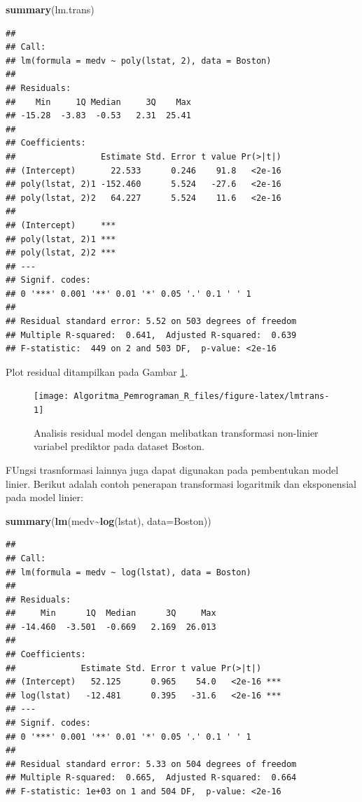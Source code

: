 \documentclass[
]{book}
\newenvironment{Shaded}{\begin{snugshade}}{\end{snugshade}}
\newcommand{\AttributeTok}[1]{\textcolor[rgb]{0.13,0.29,0.53}{#1}}
\newcommand{\FunctionTok}[1]{\textcolor[rgb]{0.13,0.29,0.53}{\textbf{#1}}}
\newcommand{\NormalTok}[1]{#1}
\newcommand{\SpecialCharTok}[1]{\textcolor[rgb]{0.81,0.36,0.00}{\textbf{#1}}}
\theoremstyle{definition}
\theoremstyle{definition}
\theoremstyle{definition}
\theoremstyle{definition}
\theoremstyle{remark}
\begin{document}
\begin{Shaded}
\begin{Highlighting}[]
\FunctionTok{summary}\NormalTok{(lm.trans)}
\end{Highlighting}
\end{Shaded}

\begin{verbatim}
## 
## Call:
## lm(formula = medv ~ poly(lstat, 2), data = Boston)
## 
## Residuals:
##    Min     1Q Median     3Q    Max 
## -15.28  -3.83  -0.53   2.31  25.41 
## 
## Coefficients:
##                 Estimate Std. Error t value Pr(>|t|)
## (Intercept)       22.533      0.246    91.8   <2e-16
## poly(lstat, 2)1 -152.460      5.524   -27.6   <2e-16
## poly(lstat, 2)2   64.227      5.524    11.6   <2e-16
##                    
## (Intercept)     ***
## poly(lstat, 2)1 ***
## poly(lstat, 2)2 ***
## ---
## Signif. codes:  
## 0 '***' 0.001 '**' 0.01 '*' 0.05 '.' 0.1 ' ' 1
## 
## Residual standard error: 5.52 on 503 degrees of freedom
## Multiple R-squared:  0.641,  Adjusted R-squared:  0.639 
## F-statistic:  449 on 2 and 503 DF,  p-value: <2e-16
\end{verbatim}

Plot residual ditampilkan pada Gambar \ref{fig:lmtrans}.

\begin{figure}

{\centering \texttt{[image: Algoritma\_Pemrograman\_R\_files/figure-latex/lmtrans-1]} 

}

\caption{Analisis residual model dengan melibatkan transformasi non-linier variabel prediktor pada dataset Boston.}\label{fig:lmtrans}
\end{figure}

FUngsi trasnformasi lainnya juga dapat digunakan pada pembentukan model linier. Berikut adalah contoh penerapan transformasi logaritmik dan eksponensial pada model linier:

\begin{Shaded}
\begin{Highlighting}[]
\FunctionTok{summary}\NormalTok{(}\FunctionTok{lm}\NormalTok{(medv}\SpecialCharTok{\textasciitilde{}}\FunctionTok{log}\NormalTok{(lstat), }\AttributeTok{data=}\NormalTok{Boston))}
\end{Highlighting}
\end{Shaded}

\begin{verbatim}
## 
## Call:
## lm(formula = medv ~ log(lstat), data = Boston)
## 
## Residuals:
##     Min      1Q  Median      3Q     Max 
## -14.460  -3.501  -0.669   2.169  26.013 
## 
## Coefficients:
##             Estimate Std. Error t value Pr(>|t|)    
## (Intercept)   52.125      0.965    54.0   <2e-16 ***
## log(lstat)   -12.481      0.395   -31.6   <2e-16 ***
## ---
## Signif. codes:  
## 0 '***' 0.001 '**' 0.01 '*' 0.05 '.' 0.1 ' ' 1
## 
## Residual standard error: 5.33 on 504 degrees of freedom
## Multiple R-squared:  0.665,  Adjusted R-squared:  0.664 
## F-statistic: 1e+03 on 1 and 504 DF,  p-value: <2e-16
\end{verbatim}
\end{document}
